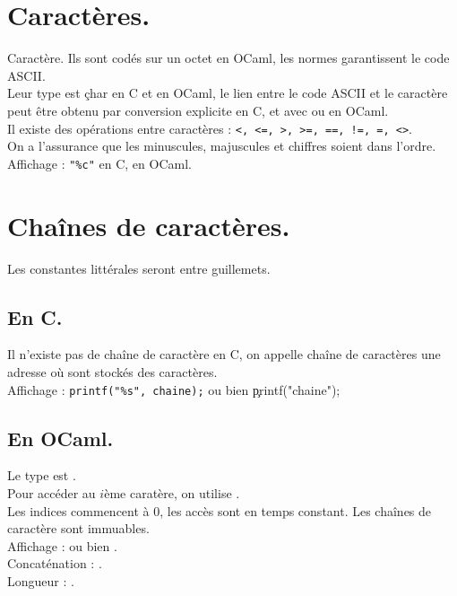 \documentclass[french, 11pt]{article}
\begin{document}


\section{Caractères.}

\begin{defi}{Caractère.}{}
    Ils sont codés sur un octet en OCaml, les normes garantissent le code ASCII.\\
    Leur type est \c{char} en C et en OCaml, le lien entre le code ASCII et le caractère peut être obtenu par conversion explicite en C, et avec  ou  en OCaml.\\
    Il existe des opérations entre caractères : \texttt{<, <=, >, >=, ==, !=, =, <>}.\\
    On a l'assurance que les minuscules, majuscules et chiffres soient dans l'ordre.\\
    Affichage : \texttt{"\%c"} en C,  en OCaml. 
\end{defi}

\pagebreak

\section{Chaînes de caractères.}

Les constantes littérales seront entre guillemets.

\subsection{En C.}

\begin{defi}{}{}
    Il n'existe pas de chaîne de caractère en C, on appelle chaîne de caractères une adresse où sont stockés des caractères.\\
    Affichage : \texttt{printf("\%s", chaine);} ou bien \c{printf("chaine");}
\end{defi}

\subsection{En OCaml.}

\begin{defi}{}{}
    Le type est .\\
    Pour accéder au $i$ème caratère, on utilise .\\
    Les indices commencent à 0, les accès sont en temps constant. Les chaînes de caractère sont immuables.\\
    Affichage :  ou bien .\\
    Concaténation : .\\
    Longueur : .
\end{defi}
\end{document}
